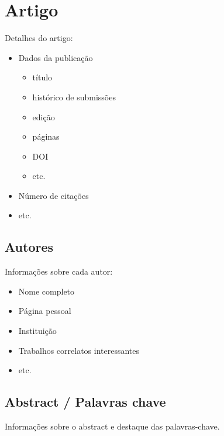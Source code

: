 \documentclass{UnBeamer}%
\begin{document}
    \section{Artigo}%
    \begin{frame}%
        Detalhes do artigo:
        \begin{itemize}
            \item Dados da publicação
            \begin{itemize}%
                \item título%
                \item histórico de submissões%
                \item edição%
                \item páginas%
                \item DOI%
                \item etc.%
            \end{itemize}
            \item Número de citações
            \item etc.
        \end{itemize}
    \end{frame}%

    \subsection{Autores}%
    \begin{frame}%
        Informações sobre cada autor:
        \begin{itemize}
            \item Nome completo
            \item Página pessoal
            \item Instituição
            \item Trabalhos correlatos interessantes
            \item etc.
        \end{itemize}
    \end{frame}%

    \subsection{Abstract / Palavras chave}%
    \begin{frame}%
        Informações sobre o abstract e destaque das palavras-chave.
    \end{frame}%
\end{document}
